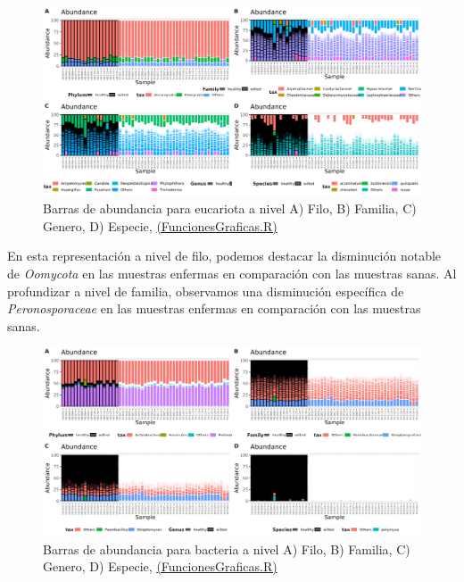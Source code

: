 \begin{figure}[h]
\centering
\includegraphics[width=\textwidth]{Img/cap2/Barras_Eukarya10.png}
\caption{Barras de abundancia para eucariota a nivel A) Filo, B) Familia, C) Genero, D) Especie,  \href{https://github.com/CamilaSilva1995/Tesis_Maestria/blob/main/Analisis_Comparativo/Fresa_Solena/20230227_Funciones&Graficas.R}{(FuncionesGraficas.R)}}
\end{figure}

En esta representación a nivel de filo, podemos destacar la disminución notable de \textit{Oomycota} en las muestras enfermas en comparación con las muestras sanas. Al profundizar a nivel de familia, observamos una disminución específica de \textit{Peronosporaceae} en las muestras enfermas en comparación con las muestras sanas.\\

\begin{figure}[h]
\centering
\includegraphics[width=\textwidth]{Img/cap2/Barras_Bacteria10.png}
\caption{Barras de abundancia para bacteria a nivel A) Filo, B) Familia, C) Genero, D) Especie, \href{https://github.com/CamilaSilva1995/Tesis_Maestria/blob/main/Analisis_Comparativo/Fresa_Solena/20230227_Funciones&Graficas.R}{(FuncionesGraficas.R)}}
\end{figure}

